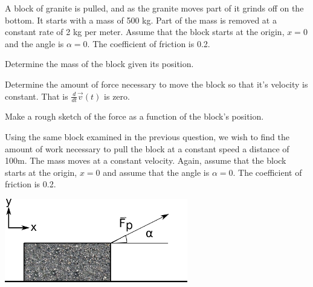 \begin{problem}
\begin{subproblem}
      \vfill

%
      \vfill

%

  \end{subproblem}


\end{problem}


\begin{problem}
\item A block of granite is pulled, and as the granite moves part of
  it grinds off on the bottom. It starts with a mass of 500 kg. Part
  of the mass is removed at a constant rate of 2 kg per meter. Assume
  that the block starts at the origin, $x=0$ and the angle is
  $\alpha=0$. The coefficient of friction is 0.2.

  \begin{subproblem}
  \item Determine the mass of the block given its position.
    \vfill
  \item Determine the amount of force necessary to move the block so
    that it's velocity is constant. That is
    $\frac{d}{dt} \vec{v}(t)$ is zero.
    \vfill
  \item Make a rough sketch of the force as a function of the block's
    position.  

    \vfill
  \end{subproblem}

\clearpage

\item Using the same block examined in the previous question, we wish
  to find the amount of work necessary to pull the block at a constant
  speed a distance of 100m. The mass moves at a constant
  velocity. Again, assume that the block starts at the origin, $x=0$
  and assume that the angle is $\alpha=0$. The coefficient of friction
  is 0.2.

  \includegraphics[width=8cm]{ink/week7/dragBlock}


\end{problem}
